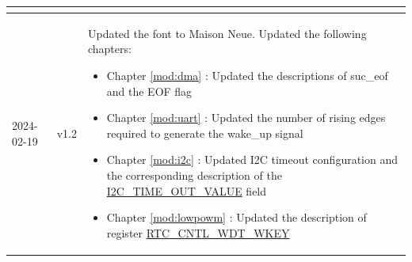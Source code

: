 \begin{longtable}[l]{ | m{2cm} | m{1.5cm} | m{12cm} | }
\begin{itemize}
     \end{itemize}
     \\\hline
    2024-02-19 & v1.2 &
    Updated the font to Maison Neue. %
    \newline
    Updated the following chapters:
    \begin{itemize}
        \item Chapter \ref{mod:dma} \textit{\nameref{mod:dma}}: Updated the descriptions of suc\_eof and the EOF flag %
        \item Chapter \ref{mod:uart} \textit{\nameref{mod:uart}}: Updated the number of rising edges required to generate the wake\_up signal %
        \item Chapter \ref{mod:i2c} \textit{\nameref{mod:i2c}}: Updated I2C timeout configuration and the corresponding description of the \hyperref[fielddesc:I2CTIMEOUTVALUE]{I2C\_TIME\_OUT\_VALUE} field %
        \item Chapter \ref{mod:lowpowm} \textit{\nameref{mod:lowpowm}}: Updated the description of register \hyperref[fielddesc:RTCCNTLWDTWKEY]{RTC\_CNTL\_WDT\_WKEY}%
    \end{itemize}
    \\\hline


\end{longtable}
